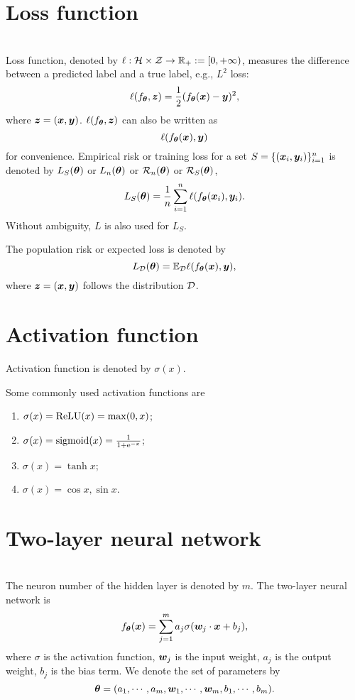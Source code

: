 \documentclass[]{article}
\begin{document}
\section{Loss function}~\\
Loss function, denoted by $\ell:\mathcal{H}\times\mathcal{Z}\to\mathbb{R}_+:=[0,+\infty)$, measures the difference between a predicted label and a true label, e.g., $L^2$ loss: 
\[
\ell(f_{\bm{\theta}},\bm{z})=\frac{1}{2}(f_{\bm{\theta}}(\bm{x})-\bm{y})^2,
\]
 where $\bm{z}=(\bm{x},\bm{y})$. $\ell(f_{\bm{\theta}},\bm{z})$ can also be written as 
\[
\ell(f_{\bm{\theta}}(\bm{x}),\bm{y})
\]
 for convenience.
Empirical risk or training loss for a set $S=\{(\bm{x}_i,\bm{y}_i)\}_{i=1}^{n}$ is denoted by   $L_S(\bm{\theta})$ or $L_{n}(\bm{\theta})$ or $\mathcal{R}_{n}(\bm{\theta})$ or $\mathcal{R}_{S}(\bm{\theta})$,
\begin{equation}
    L_S(\bm{\theta}) =\frac{1}{n}\sum_{i=1}^n\ell(f_{\bm{\theta}}(\bm{x}_i),\bm{y}_i).
\end{equation}
Without ambiguity, $L$ is also used for $L_S$.

The population risk or expected loss is denoted by
\begin{equation}
    L_{\mathcal{D}}(\bm{\theta}) =\mathbb{E}_{\mathcal{D}}\ell(f_{\bm{\theta}}(\bm{x}),\bm{y}),
\end{equation}
where $\bm{z}=(\bm{x},\bm{y})$ follows the distribution $\mathcal{D}$.

\section{Activation function}
Activation function is denoted by $\sigma(x)$. 
\begin{exam}Some commonly used activation functions are~\\
    \begin{enumerate}
        \item $\sigma(x) = \mathrm{ReLU} (x) = \max (0, x)$;
        \item $\sigma(x) ={\rm sigmoid}(x)= \frac{1}{1 + \mathrm{e}^{-x}}$;
        \item $\sigma(x) = \tanh x$;
        \item $\sigma(x) = \cos x, \sin x$.
    \end{enumerate}
\end{exam}


\section{Two-layer neural network}~\\
The neuron number of the hidden layer is denoted by $m$. The two-layer neural network is 
\begin{equation}
    f_{\bm{\theta}}(\bm{x})=\sum_{j=1}^{m} a_j \sigma (\bm{w}_j\cdot \bm{x} + b_j),
\end{equation}
where $\sigma$ is the activation function, $\bm{w}_j$ is the input weight, $a_j$ is the output weight, $b_j$ is the bias term. We denote the set of parameters by 
\[
\bm{\theta}=(a_1,\cdots,a_m,\bm{w}_1,\cdots,\bm{w}_m,b_1,\cdots,b_m).
\] 
\end{document}

